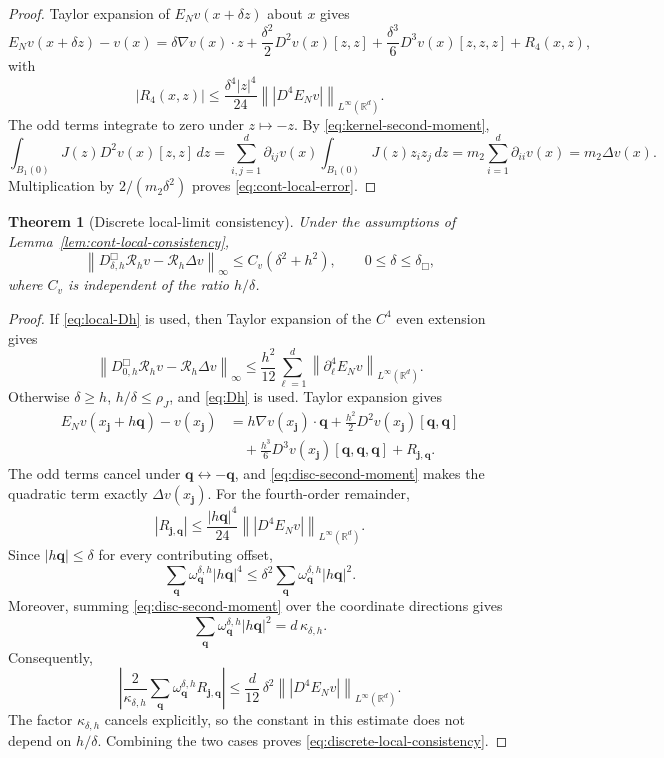\documentclass[11pt]{article}
\newtheorem{theorem}{Theorem}[section]
\theoremstyle{definition}
\newcommand{\R}{\mathbb{R}}
\newcommand{\cR}{\mathcal{R}}
\newcommand{\norm}[1]{\left\lVert #1\right\rVert}
\newcommand{\jj}{\bm j}
\newcommand{\qq}{\bm q}
\begin{document}
\begin{proof}
Taylor expansion of $E_Nv(x+\delta z)$ about $x$ gives
\[
 E_Nv(x+\delta z)-v(x)
 =
 \delta\nabla v(x)\cdot z
 +\frac{\delta^2}{2}D^2v(x)[z,z]
 +\frac{\delta^3}{6}D^3v(x)[z,z,z]
 +R_4(x,z),
\]
with
\[
 |R_4(x,z)|
 \le
 \frac{\delta^4|z|^4}{24}
 \norm{|D^4E_Nv|}_{L^\infty(\R^d)}.
\]
The odd terms integrate to zero under $z\mapsto-z$.  By
\eqref{eq:kernel-second-moment},
\[
 \int_{B_1(0)}J(z)D^2v(x)[z,z]\,dz
 =
 \sum_{i,j=1}^d
 \partial_{ij}v(x)
 \int_{B_1(0)}J(z)z_i z_j\,dz
 =
 m_2\sum_{i=1}^d\partial_{ii}v(x)
 =
 m_2\Delta v(x).
\]
Multiplication by $2/(m_2\delta^2)$ proves \eqref{eq:cont-local-error}.
\end{proof}

\begin{theorem}[Discrete local-limit consistency]
\label{thm:discrete-local-consistency}
Under the assumptions of Lemma~\ref{lem:cont-local-consistency},
\begin{equation}
\label{eq:discrete-local-consistency}
 \norm{D_{\delta,h}^{\Box}\cR_hv-\cR_h\Delta v}_\infty
 \le C_v(\delta^2+h^2),
 \qquad
 0\le\delta\le\delta_{\Box},
\end{equation}
where $C_v$ is independent of the ratio $h/\delta$.
\end{theorem}

\begin{proof}
If \eqref{eq:local-Dh} is used, then Taylor expansion of the
$C^4$ even extension gives
\[
 \norm{D_{0,h}^{\Box}\cR_hv-\cR_h\Delta v}_\infty
 \le
 \frac{h^2}{12}
 \sum_{\ell=1}^d
 \norm{\partial_\ell^4E_Nv}_{L^\infty(\R^d)}.
\]
Otherwise $\delta\ge h$, $h/\delta\le\rho_J$, and \eqref{eq:Dh} is used.  Taylor expansion gives
\[
\begin{aligned}
 E_Nv(x_{\jj}+h\qq)-v(x_{\jj})
 &=
 h\nabla v(x_{\jj})\cdot\qq
 +\frac{h^2}{2}D^2v(x_{\jj})[\qq,\qq]\\
 &\quad
 +\frac{h^3}{6}D^3v(x_{\jj})[\qq,\qq,\qq]
 +R_{\jj,\qq}.
\end{aligned}
\]
The odd terms cancel under $\qq\leftrightarrow-\qq$, and
\eqref{eq:disc-second-moment} makes the quadratic term exactly
$\Delta v(x_{\jj})$.  For the fourth-order remainder,
\[
 |R_{\jj,\qq}|
 \le
 \frac{|h\qq|^4}{24}
 \norm{|D^4E_Nv|}_{L^\infty(\R^d)}.
\]
Since $|h\qq|\le\delta$ for every contributing offset,
\[
 \sum_{\qq}\omega_{\qq}^{\delta,h}|h\qq|^4
 \le
 \delta^2
 \sum_{\qq}\omega_{\qq}^{\delta,h}|h\qq|^2.
\]
Moreover, summing \eqref{eq:disc-second-moment} over the coordinate directions gives
\[
 \sum_{\qq}\omega_{\qq}^{\delta,h}|h\qq|^2
 =d\,\kappa_{\delta,h}.
\]
Consequently,
\[
 \left|
 \frac{2}{\kappa_{\delta,h}}
 \sum_{\qq}\omega_{\qq}^{\delta,h}R_{\jj,\qq}
 \right|
 \le
 \frac{d}{12}\,\delta^2
 \norm{|D^4E_Nv|}_{L^\infty(\R^d)}.
\]
The factor $\kappa_{\delta,h}$ cancels explicitly, so the constant in this
estimate does not depend on $h/\delta$.  Combining the two cases proves
\eqref{eq:discrete-local-consistency}.
\end{proof}
\end{document}
